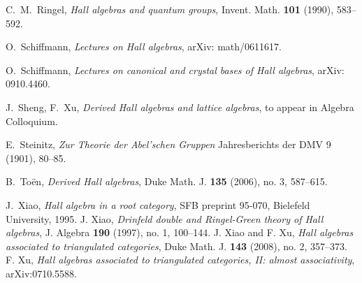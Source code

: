 \documentclass{amsart}
\theoremstyle{definition}
\numberwithin{equation}{section}
\begin{document}
\begin{thebibliography}{10}
 C.~M.~Ringel, \emph{Hall algebras and quantum groups}, Invent. Math. {\bf 101} (1990), 583--592.

 O.~Schiffmann, \emph{Lectures on Hall
algebras}, arXiv: math/0611617.

 O.~Schiffmann, \textit{Lectures on canonical and crystal bases of Hall
algebras}, arXiv: 0910.4460.

 J.~Sheng, F.~Xu, \emph{Derived Hall algebras and lattice algebras}, to appear in Algebra
Colloquium.

 E.~Steinitz, \emph{Zur Theorie der Abel'schen Gruppen} Jahresberichts der DMV 9 (1901), 80--85.

 B.~To\"en, \textit{Derived Hall algebras}, Duke Math. J. {\bf 135} (2006), no. 3, 587--615.

 J.~Xiao, \emph{Hall algebra in a root category}, SFB preprint 95-070,
Bielefeld University, 1995.
 J. Xiao, \textit{Drinfeld double and Ringel-Green theory of Hall algebras}, J. Algebra {\bf 190} (1997), no. 1,
100--144.
 J. Xiao and F. Xu, \textit{Hall algebras associated to triangulated categories}, Duke Math. J. {\bf 143} (2008),
no. 2, 357--373.
 F. Xu, \textit{Hall algebras associated to triangulated categories, II: almost
associativity}, arXiv:0710.5588.
\end{thebibliography}
\end{document}
